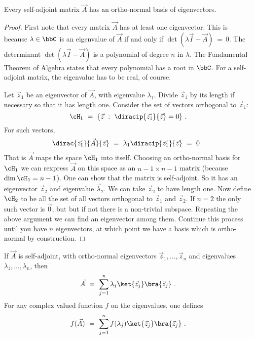 \documentclass[12pt]{amsart}
\numberwithin{equation}{section}
\numberwithin{figure}{section}
\theoremstyle{theorem}
\begin{document}
	\begin{thm} Every self-adjoint matrix $\vec{A}$ has an ortho-normal basis 
	of eigenvectors.
		\end{thm}
	\begin{proof} First note that every matrix $\vec{A}$ has at least one 
	eigenvector.  This is because $\lambda\in \bbC$ is an eigenvalue of 
	$\vec{A}$ if and only if $\det (\lambda \vec{I} - \vec{A}) \ = \ 0 $.  The 
	determinant $\det (\lambda \vec{I} - \vec{A})$ is a polynomial of degree 
	$n$ in $\lambda$. The Fundamental Theorem of Algebra states that every 
	polynomial has a root in $\bbC$.  For a self-adjoint matrix, the eigenvalue 
	has to be real, of course.
		
		Let $\vec{z}_1$ be an eigenvector of $\vec{A}$, with eigenvalue 
		$\lambda_1$.  Divide $\vec{z}_1$ by its length if necessary so that it 
		has length one. Consider the set of vectors orthogonal to $\vec{z}_1$:
		$$\cH_1 \ = \ \{ \vec{z} \ : \ \diracip{\vec{z_1}}{\vec{z}} = 0 \} \ .$$
		For such vectors,
		$$\dirac{\vec{z_1}}{\vec{A}}{\vec{z}} \ = \ \lambda_1  
		\diracip{\vec{z_1}}{\vec{z}} \ = \ 0 \ . $$
		That is $\vec{A}$ maps the space  $\cH_1$ into itself.  Choosing an 
		ortho-normal basis for $\cH_1$ we can rexpress $\vec{A}$ on this space 
		as an $n-1 \times n-1$ matrix (because $\dim \cH_1=n-1$).  One can show 
		that the matrix is self-adjoint.  So it has an eigenvector $\vec{z}_2$ 
		and eigenvalue $\vec{\lambda}_2$.  We can take $\vec{z}_2$ to have 
		length one. Now define $\cH_2$ to be all the set 
		of all vectors orthogonal to $\vec{z}_1$ and $\vec{z}_2$.  If $n=2$ the 
		only such vector is $\vec{0}$, but but if not there is a non-trivial 
		subspace.  Repeating the above argument we can find an eigenvector 
		among them.  Continue this process until you have $n$ eigenvectors, at 
		which  point we have a basis which is ortho-normal by construction.
		\end{proof}
	
		If $\vec{A}$ is self-adjoint, with ortho-normal eigenvectors 
		$\vec{z}_1,\ldots,\vec{z}_n$ and eigenvalues 
		$\lambda_1,\ldots,\lambda_n$, then 
		\begin{equation}\label{eq:Aevevrep}
			\vec{A} \ = \ \sum_{j=1}^n \lambda_j \ket{\vec{z}_j} 
			\bra{\vec{z}_j} \ . 
			\end{equation} 
		For any complex valued function $f$ on the eigenvalues, one defines
		\begin{equation}\label{eq:f(A)}
			f(\vec{A}) \ = \ \sum_{j=1}^n f(\lambda_j) \ket{\vec{z}_j} 
			\bra{\vec{z}_j} \ .
		\end{equation}
\end{document}
